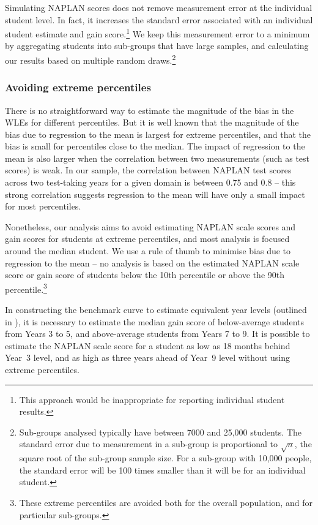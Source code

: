 Simulating NAPLAN scores does not remove measurement error at the individual student level. In fact, it increases the standard error associated with an individual student estimate and gain score.\footnote{This approach would be inappropriate for reporting individual student results.} We keep this measurement error to a minimum by aggregating students into sub-groups that have large samples, and calculating our results based on multiple random draws.\footnote{Sub-groups analysed typically have between 7000 and 25,000 students. The standard error due to measurement in a sub-group is proportional to $\sqrt{n}$, the square root of the sub-group sample size. For a sub-group with 10,000 people, the standard error will be 100 times smaller than it will be for an individual student.}

\subsubsection*{Avoiding extreme percentiles}

There is no straightforward way to estimate the magnitude of the bias in the WLEs for different percentiles. But it is well known that the magnitude of the bias due to regression to the mean is largest for extreme percentiles, and that the bias is small for percentiles close to the median. The impact of regression to the mean is also larger when the correlation between two measurements (such as test scores) is weak. In our sample, the correlation between NAPLAN test scores across two test-taking years for a given domain is between 0.75 and 0.8 -- this strong correlation suggests regression to the mean will have only a small impact for most percentiles.

Nonetheless, our analysis aims to avoid estimating NAPLAN scale scores and gain scores for students at extreme percentiles, and most analysis is focused around the median student. We use a rule of thumb to minimise bias due to regression to the mean -- no analysis is based on the estimated NAPLAN scale score or gain score of students below the 10th percentile or above the 90th percentile.\footnote{These extreme percentiles are avoided both for the overall population, and for particular sub-groups.}

In constructing the benchmark curve to estimate equivalent year levels (outlined in ), it is necessary to estimate the median gain score of below-average students from Years 3 to 5, and above-average students from Years 7 to 9. It is possible to estimate the NAPLAN scale score for a student as low as 18 months behind \mbox{Year 3} level, and as high as three years ahead of \mbox{Year 9} level without using extreme percentiles.

